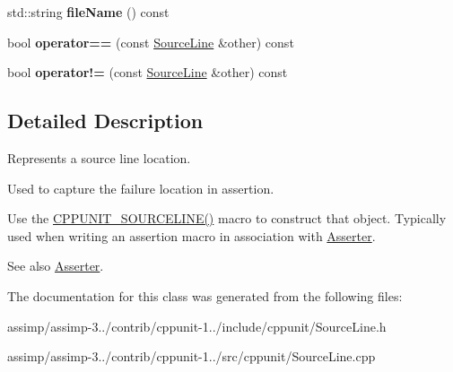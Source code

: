 \begin{DoxyCompactItemize}
\item 
\hypertarget{class_source_line_a1571a51d45ebcea382b86224ef767a2e}{std\+::string {\bfseries file\+Name} () const }\label{class_source_line_a1571a51d45ebcea382b86224ef767a2e}

\item 
\hypertarget{class_source_line_a6c9eff68161f364725b3a51fc60c3e01}{bool {\bfseries operator==} (const \hyperlink{class_source_line}{Source\+Line} \&other) const }\label{class_source_line_a6c9eff68161f364725b3a51fc60c3e01}

\item 
\hypertarget{class_source_line_aa4633f46f9c9f470c6b680327d002e86}{bool {\bfseries operator!=} (const \hyperlink{class_source_line}{Source\+Line} \&other) const }\label{class_source_line_aa4633f46f9c9f470c6b680327d002e86}

\end{DoxyCompactItemize}


\subsection{Detailed Description}
Represents a source line location.

Used to capture the failure location in assertion. 

Use the \hyperlink{group___creating_new_assertions_ga76898763afdc78bf5924dd7744b4c630}{C\+P\+P\+U\+N\+I\+T\+\_\+\+S\+O\+U\+R\+C\+E\+L\+I\+N\+E()} macro to construct that object. Typically used when writing an assertion macro in association with \hyperlink{struct_asserter}{Asserter}.

\begin{DoxySeeAlso}{See also}
\hyperlink{struct_asserter}{Asserter}. 
\end{DoxySeeAlso}


The documentation for this class was generated from the following files\+:\begin{DoxyCompactItemize}
\item 
assimp/assimp-\/3../contrib/cppunit-\/1../include/cppunit/Source\+Line.\+h\item 
assimp/assimp-\/3../contrib/cppunit-\/1../src/cppunit/Source\+Line.\+cpp\end{DoxyCompactItemize}
